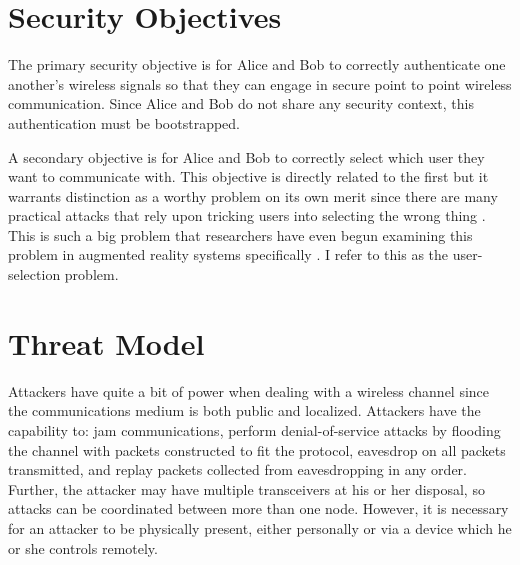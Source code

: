 \documentclass[12pt]{report}
\begin{document}
\section{Security Objectives}
The primary security objective is for Alice and Bob to correctly authenticate one another's wireless signals so that they can engage in secure point to point wireless communication. Since Alice and Bob do not share any security context, this authentication must be bootstrapped. \par

A secondary objective is for Alice and Bob to correctly select which user they want to communicate with. This objective is directly related to the first but it warrants distinction as a worthy problem on its own merit since there are many practical attacks that rely upon tricking users into selecting the wrong thing \cite{PairingInterfaceConstrainedRushingSaxena2009,WhyPhishingWorksDhamija2006}. This is such a big problem that researchers have even begun examining this problem in augmented reality systems specifically \cite{SecurityAndPrivacyForARRoesner2014}. I refer to this as the user-selection problem. \par

\section{Threat Model}
Attackers have quite a bit of power when dealing with a wireless channel since the communications medium is both public and localized. Attackers have the capability to: jam communications, perform denial-of-service attacks by flooding the channel with packets constructed to fit the protocol, eavesdrop on all packets transmitted, and replay packets collected from eavesdropping in any order. Further, the attacker may have multiple transceivers at his or her disposal, so attacks can be coordinated between more than one node. However, it is necessary for an attacker to be physically present, either personally or via a device which he or she controls remotely. \par
\end{document}
